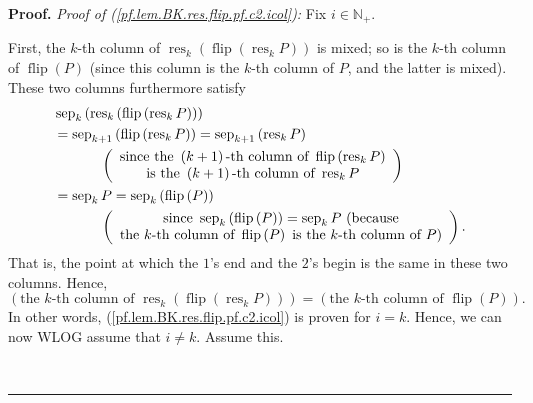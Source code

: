 \documentclass[numbers=enddot,12pt,final,onecolumn,notitlepage]{scrartcl}%
\theoremstyle{definition}
\newenvironment{proof}[1][Proof]{\noindent\textbf{#1.} }{\ \rule{0.5em}{0.5em}}
\newenvironment{verlong}{}{}
\begin{document}
\begin{verlong}
\begin{proof}
\textit{Proof of (\ref{pf.lem.BK.res.flip.pf.c2.icol}):} Fix $i\in
\mathbb{N}_{+}$.

First, the $k$-th column of $\operatorname*{res}\nolimits_{k}\left(
\operatorname*{flip}\left(  \operatorname*{res}\nolimits_{k}P\right)  \right)
$ is mixed; so is the $k$-th column of $\operatorname*{flip}\left(  P\right)
$ (since this column is the $k$-th column of $P$, and the latter is mixed).
These two columns furthermore satisfy%
\begin{align*}
&  \operatorname*{sep}\nolimits_{k}\left(  \operatorname*{res}\nolimits_{k}%
\left(  \operatorname*{flip}\left(  \operatorname*{res}\nolimits_{k}P\right)
\right)  \right) \\
&  =\operatorname*{sep}\nolimits_{k+1}\left(  \operatorname*{flip}\left(
\operatorname*{res}\nolimits_{k}P\right)  \right)  =\operatorname*{sep}%
\nolimits_{k+1}\left(  \operatorname*{res}\nolimits_{k}P\right) \\
&  \ \ \ \ \ \ \ \ \ \ \left(
\begin{array}
[c]{c}%
\text{since the }\left(  k+1\right)  \text{-th column of }\operatorname*{flip}%
\left(  \operatorname*{res}\nolimits_{k}P\right) \\
\text{is the }\left(  k+1\right)  \text{-th column of }\operatorname*{res}%
\nolimits_{k}P
\end{array}
\right) \\
&  =\operatorname*{sep}\nolimits_{k}P=\operatorname*{sep}\nolimits_{k}\left(
\operatorname*{flip}\left(  P\right)  \right) \\
&  \ \ \ \ \ \ \ \ \ \ \left(
\begin{array}
[c]{c}%
\text{since }\operatorname*{sep}\nolimits_{k}\left(  \operatorname*{flip}%
\left(  P\right)  \right)  =\operatorname*{sep}\nolimits_{k}P\text{
(because}\\
\text{the }k\text{-th column of }\operatorname*{flip}\left(  P\right)  \text{
is the }k\text{-th column of }P\text{)}%
\end{array}
\right)  .
\end{align*}
That is, the point at which the $1$'s end and the $2$'s begin is the same in
these two columns. Hence,%
\[
\left(  \text{the }k\text{-th column of }\operatorname*{res}\nolimits_{k}%
\left(  \operatorname*{flip}\left(  \operatorname*{res}\nolimits_{k}P\right)
\right)  \right)  =\left(  \text{the }k\text{-th column of }%
\operatorname*{flip}\left(  P\right)  \right)  .
\]
In other words, (\ref{pf.lem.BK.res.flip.pf.c2.icol}) is proven for $i=k$.
Hence, we can now WLOG assume that $i\neq k$. Assume this.


\end{proof}
\end{verlong}
\end{document}
